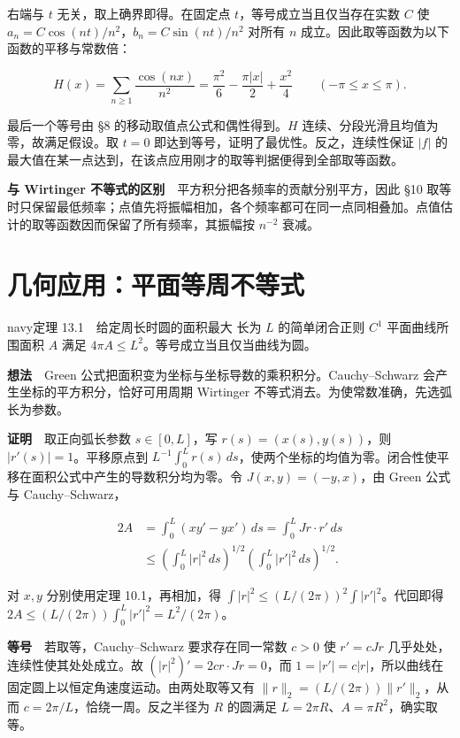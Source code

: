 \documentclass[12pt,a4paper]{article}
\newcommand{\mysection}[1]{\clearpage\section{#1}}
\begin{document}
右端与 \(t\) 无关，取上确界即得。在固定点 \(t\)，等号成立当且仅当存在实数 \(C\) 使 \(a_n=C\cos(nt)/n^2\)，\(b_n=C\sin(nt)/n^2\) 对所有 \(n\) 成立。因此取等函数为以下函数的平移与常数倍：

\[
 H(x)=\sum_{n\ge1}\frac{\cos(nx)}{n^2}
 =\frac{\pi^2}{6}-\frac{\pi |x|}{2}+\frac{x^2}{4}
 \qquad(-\pi\le x\le\pi).
\]

最后一个等号由 §8 的移动取值点公式和偶性得到。\(H\) 连续、分段光滑且均值为零，故满足假设。取 \(t=0\) 即达到等号，证明了最优性。反之，连续性保证 \(|f|\) 的最大值在某一点达到，在该点应用刚才的取等判据便得到全部取等函数。

\textbf{与 Wirtinger 不等式的区别}　平方积分把各频率的贡献分别平方，因此 §10 取等时只保留最低频率；点值先将振幅相加，各个频率都可在同一点同相叠加。点值估计的取等函数因而保留了所有频率，其振幅按 \(n^{-2}\) 衰减。

\mysection{几何应用：平面等周不等式}




\begin{sboxenv}{navy}{定理 13.1　给定周长时圆的面积最大}
长为 \(L\) 的简单闭合正则 \(C^1\) 平面曲线所围面积 \(A\) 满足 \(4\pi A\le L^2\)。等号成立当且仅当曲线为圆。
\end{sboxenv}

\textbf{想法}　Green 公式把面积变为坐标与坐标导数的乘积积分。Cauchy--Schwarz 会产生坐标的平方积分，恰好可用周期 Wirtinger 不等式消去。为使常数准确，先选弧长为参数。

\textbf{证明}　取正向弧长参数 \(s\in[0,L]\)，写 \(r(s)=(x(s),y(s))\)，则 \(|r'(s)|=1\)。平移原点到 \(L^{-1}\int_0^L r(s)\,ds\)，使两个坐标的均值为零。闭合性使平移在面积公式中产生的导数积分均为零。令 \(J(x,y)=(-y,x)\)，由 Green 公式与 Cauchy--Schwarz，

\[
 \begin{aligned}
 2A&=\int_0^L (xy'-yx')\,ds=\int_0^L Jr\cdot r'\,ds\\
 &\le\left(\int_0^L|r|^2\,ds\right)^{1/2}
       \left(\int_0^L|r'|^2\,ds\right)^{1/2}.
 \end{aligned}
\]

对 \(x,y\) 分别使用定理 10.1，再相加，得 \(\int|r|^2\le(L/(2\pi))^2\int|r'|^2\)。代回即得 \(2A\le (L/(2\pi))\int_0^L|r'|^2=L^2/(2\pi)\)。

\textbf{等号}　若取等，Cauchy--Schwarz 要求存在同一常数 \(c>0\) 使 \(r'=cJr\) 几乎处处，连续性使其处处成立。故 \((|r|^2)'=2cr\cdot Jr=0\)，而 \(1=|r'|=c|r|\)，所以曲线在固定圆上以恒定角速度运动。由两处取等又有 \(\|r\|_2=(L/(2\pi))\|r'\|_2\)，从而 \(c=2\pi/L\)，恰绕一周。反之半径为 \(R\) 的圆满足 \(L=2\pi R\)、\(A=\pi R^2\)，确实取等。
\end{document}
